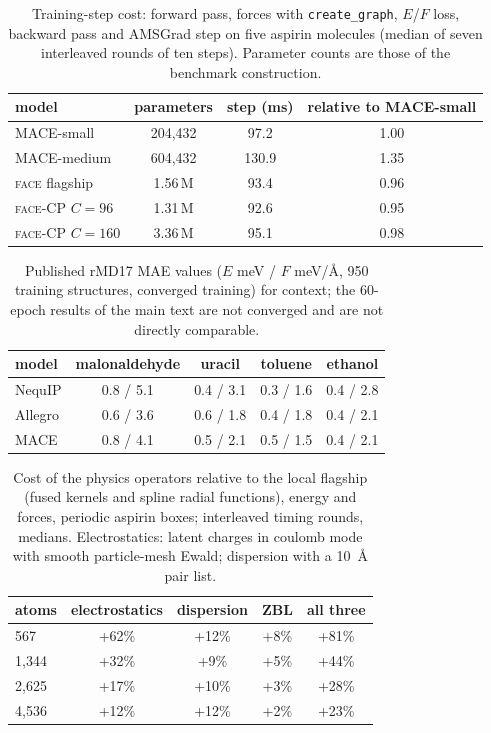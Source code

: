 \documentclass[journal=jctcce,manuscript=suppinfo,layout=traditional]{achemso}
\newcommand{\FACE}{\textsc{face}}
\begin{document}
\begin{table}[h]
\caption{Training-step cost: forward pass, forces with \texttt{create\_graph}, $E$/$F$ loss, backward pass and
AMSGrad step on five aspirin molecules (median of seven interleaved rounds of ten steps). Parameter counts are those
of the benchmark construction.}
\label{tab:trainstep}
\begin{tabular}{lccc}
\toprule
model & parameters & step (ms) & relative to MACE-small \\
\midrule
MACE-small & 204,432 & 97.2 & 1.00 \\
MACE-medium & 604,432 & 130.9 & 1.35 \\
\FACE{} flagship & 1.56\,M & 93.4 & 0.96 \\
\FACE-CP $C=96$ & 1.31\,M & 92.6 & 0.95 \\
\FACE-CP $C=160$ & 3.36\,M & 95.1 & 0.98 \\
\bottomrule
\end{tabular}
\end{table}

\begin{table}[h]
\caption{Published rMD17 MAE values ($E$ meV / $F$ meV/\AA, 950 training structures, converged training) for
context; the 60-epoch results of the main text are not converged and are not directly comparable.}
\label{tab:published}
\begin{tabular}{lcccc}
\toprule
model & malonaldehyde & uracil & toluene & ethanol \\
\midrule
NequIP & 0.8 / 5.1 & 0.4 / 3.1 & 0.3 / 1.6 & 0.4 / 2.8 \\
Allegro & 0.6 / 3.6 & 0.6 / 1.8 & 0.4 / 1.8 & 0.4 / 2.1 \\
MACE & 0.8 / 4.1 & 0.5 / 2.1 & 0.5 / 1.5 & 0.4 / 2.1 \\
\bottomrule
\end{tabular}
\end{table}

\begin{table}[h]
\caption{Cost of the physics operators relative to the local flagship (fused kernels and spline radial functions),
energy and forces, periodic aspirin boxes; interleaved timing rounds, medians. Electrostatics: latent charges in
coulomb mode with smooth particle-mesh Ewald; dispersion with a 10~\AA{} pair list.}
\label{tab:operators}
\begin{tabular}{lcccc}
\toprule
atoms & electrostatics & dispersion & ZBL & all three \\
\midrule
567 & +62\% & +12\% & +8\% & +81\% \\
1,344 & +32\% & +9\% & +5\% & +44\% \\
2,625 & +17\% & +10\% & +3\% & +28\% \\
4,536 & +12\% & +12\% & +2\% & +23\% \\
\bottomrule
\end{tabular}
\end{table}
\end{document}

